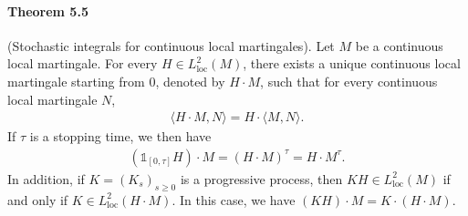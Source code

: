 \documentclass{article}
\numberwithin{equation}{section}
\theoremstyle{plain}
\theoremstyle{definition}
\begin{document}
\paragraph{Theorem 5.5\label{thm:5.5}} (Stochastic integrals for continuous local martingales). Let $M$ be a continuous local martingale. For every $H\in L^2_{\mathrm{loc}}(M)$, there exists a unique continuous local martingale starting from $0$, denoted by $H\cdot M$, such that for every continuous local martingale $N$,
\begin{align*}
	\langle H\cdot M,N\rangle = H\cdot\langle M,N\rangle.\tag{5.3}\label{eq:5.3}
\end{align*}
If $\tau$ is a stopping time, we then have
\begin{align*}
	(\mathds{1}_{[0,\tau]}H)\cdot M = (H\cdot M)^\tau = H\cdot M^\tau.\tag{5.4}\label{eq:5.4}
\end{align*}
In addition, if $K=(K_s)_{s\geq 0}$ is a progressive process, then $KH\in L^2_{\mathrm{loc}}(M)$ if and only if $K\in L^2_{\mathrm{loc}}(H\cdot M)$. In this case, we have $(KH)\cdot M = K\cdot(H\cdot M)$.
\end{document}
